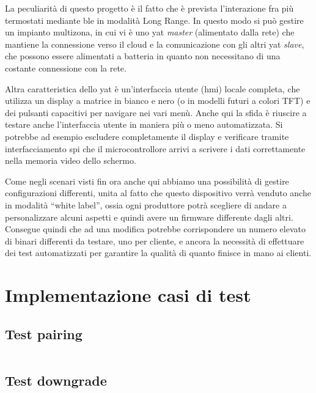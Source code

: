 \documentclass[12pt,a4paper,twoside,titlepage]{book}
\begin{document}
La peculiarità di questo progetto è il fatto che è prevista l'interazione fra più
termostati mediante \acrshort{ble} in modalità Long Range. In questo modo
si può gestire un impianto multizona, in cui vi è uno \acrshort{yat} \textit{master} (alimentato
dalla rete) che mantiene la connessione verso il \gls{cloud} e la comunicazione
con gli altri \acrshort{yat} \textit{slave}, che possono essere alimentati a batteria
in quanto non necessitano di una costante connessione con la rete.

Altra caratteristica dello \acrshort{yat} è un'interfaccia utente (\acrshort{hmi})
locale completa, che utilizza un display a matrice in bianco e nero (o in modelli
futuri a colori TFT) e dei pulsanti capacitivi per navigare nei vari menù. Anche
qui la sfida è riuscire a testare anche l'interfaccia utente in maniera più o meno
automatizzata. Si potrebbe ad esempio escludere completamente il display e verificare
tramite interfacciamento \acrshort{spi} che il microcontrollore arrivi a scrivere i dati correttamente
nella memoria video dello schermo.

Come negli scenari visti fin ora anche qui abbiamo una possibilità di gestire configurazioni
differenti, unita al fatto che questo dispositivo verrà venduto anche in modalità ``white label'',
ossia ogni produttore potrà scegliere di andare a personalizzare alcuni aspetti e quindi
avere un \gls{firmware} differente dagli altri. Consegue quindi che ad una modifica potrebbe
corrispondere un numero elevato di binari differenti da testare, uno per cliente, e
ancora la necessità di effettuare dei test automatizzati per garantire la qualità di
quanto finisce in mano ai clienti.

\appendix

\chapter{Implementazione casi di test}
\section{Test pairing}
\label{section:impl_test_pairing}
\inputminted[]{python3}{src/test_pairing.py}

\section{Test downgrade}
\label{section:impl_test_downgrade}
\inputminted[]{python3}{src/test_downgrade.py}
\end{document}
